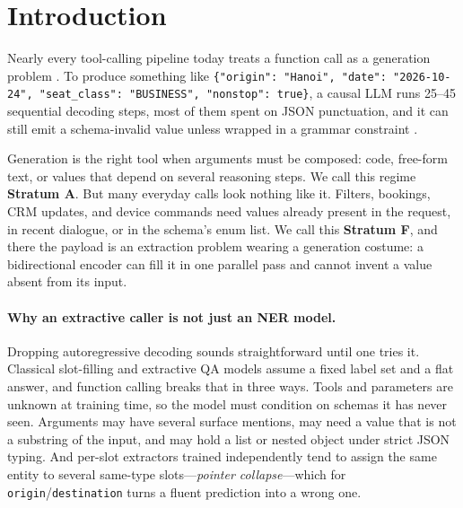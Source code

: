 \section{Introduction}

Nearly every tool-calling pipeline today treats a function call as a generation problem \citep{patil2023gorilla,schick2023toolformer,yao2023react}. To produce something like \texttt{\{"origin": "Hanoi", "date": "2026-10-24", "seat\_class": "BUSINESS", "nonstop": true\}}, a causal LLM runs 25--45 sequential decoding steps, most of them spent on JSON punctuation, and it can still emit a schema-invalid value unless wrapped in a grammar constraint \citep{willard2023outlines}.

Generation is the right tool when arguments must be composed: code, free-form text, or values that depend on several reasoning steps. We call this regime \textbf{Stratum A}. But many everyday calls look nothing like it. Filters, bookings, CRM updates, and device commands need values already present in the request, in recent dialogue, or in the schema's enum list. We call this \textbf{Stratum F}, and there the payload is an extraction problem wearing a generation costume: a bidirectional encoder can fill it in one parallel pass and cannot invent a value absent from its input.

\paragraph{Why an extractive caller is not just an NER model.}
Dropping autoregressive decoding sounds straightforward until one tries it. Classical slot-filling and extractive QA models \citep{devlin2019bert,su2022globalpointer} assume a fixed label set and a flat answer, and function calling breaks that in three ways. Tools and parameters are unknown at training time, so the model must condition on schemas it has never seen. Arguments may have several surface mentions, may need a value that is not a substring of the input, and may hold a list or nested object under strict JSON typing. And per-slot extractors trained independently tend to assign the same entity to several same-type slots---\emph{pointer collapse}---which for \texttt{origin}/\texttt{destination} turns a fluent prediction into a wrong one.

